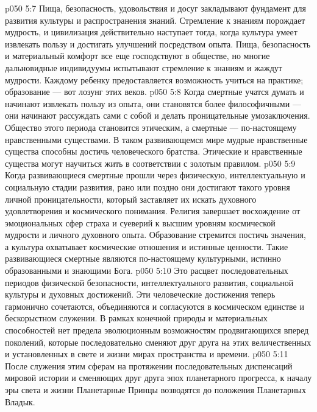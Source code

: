 \vs p050 5:7 \bibnobreakspace {} Пища, безопасность, удовольствия и досуг закладывают фундамент для развития культуры и распространения знаний. Стремление к знаниям порождает мудрость, и цивилизация действительно наступает тогда, когда культура умеет извлекать пользу и достигать улучшений посредством опыта. Пища, безопасность и материальный комфорт все еще господствуют в обществе, но многие дальновидные индивидуумы испытывают стремление к знаниям и жаждут мудрости. Каждому ребенку предоставляется возможность учиться на практике; образование --- вот лозунг этих веков.
\vs p050 5:8 \bibnobreakspace {} Когда смертные учатся думать и начинают извлекать пользу из опыта, они становятся более философичными --- они начинают рассуждать сами с собой и делать проницательные умозаключения. Общество этого периода становится этическим, а смертные --- по\hyp{}настоящему нравственными существами. В таком развивающемся мире мудрые нравственные существа способны достичь человеческого братства. Этические и нравственные существа могут научиться жить в соответствии с золотым правилом.
\vs p050 5:9 \bibnobreakspace {} Когда развивающиеся смертные прошли через физическую, интеллектуальную и социальную стадии развития, рано или поздно они достигают такого уровня личной проницательности, который заставляет их искать духовного удовлетворения и космического понимания. Религия завершает восхождение от эмоциональных сфер страха и суеверий к высшим уровням космической мудрости и личного духовного опыта. Образование стремится постичь значения, а культура охватывает космические отношения и истинные ценности. Такие развивающиеся смертные являются по\hyp{}настоящему культурными, истинно образованными и знающими Бога.
\vs p050 5:10 \bibnobreakspace {} Это расцвет последовательных периодов физической безопасности, интеллектуального развития, социальной культуры и духовных достижений. Эти человеческие достижения теперь гармонично сочетаются, объединяются и согласуются в космическом единстве и бескорыстном служении. В рамках конечной природы и материальных способностей нет предела эволюционным возможностям продвигающихся вперед поколений, которые последовательно сменяют друг друга на этих величественных и установленных в свете и жизни мирах пространства и времени.
\vs p050 5:11 \pc После служения этим сферам на протяжении последовательных диспенсаций мировой истории и сменяющих друг друга эпох планетарного прогресса, к началу эры света и жизни Планетарные Принцы возводятся до положения Планетарных Владык.
